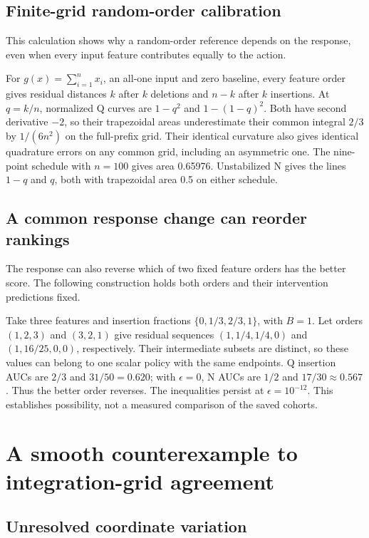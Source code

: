 \documentclass[12pt,letterpaper]{article}
\begin{document}
\subsection{Finite-grid random-order calibration}
\label{sec:random-calibration}

This calculation shows why a random-order reference depends on the response, even when every input feature contributes equally to the action.

For $g(x)=\sum_{i=1}^n x_i$, an all-one input and zero baseline, every feature order gives residual distances $k$ after $k$ deletions and $n-k$ after $k$ insertions. At $q=k/n$, normalized Q curves are $1-q^2$ and $1-(1-q)^2$. Both have second derivative $-2$, so their trapezoidal areas underestimate their common integral $2/3$ by $1/(6n^2)$ on the full-prefix grid. Their identical curvature also gives identical quadrature errors on any common grid, including an asymmetric one. The nine-point schedule with $n=100$ gives area 0.65976. Unstabilized N gives the lines $1-q$ and $q$, both with trapezoidal area 0.5 on either schedule.

\subsection{A common response change can reorder rankings}
\label{sec:ranking-comparison}

The response can also reverse which of two fixed feature orders has the better score. The following construction holds both orders and their intervention predictions fixed.

Take three features and insertion fractions $\{0,1/3,2/3,1\}$, with $B=1$. Let orders $(1,2,3)$ and $(3,2,1)$ give residual sequences $(1,1/4,1/4,0)$ and $(1,16/25,0,0)$, respectively. Their intermediate subsets are distinct, so these values can belong to one scalar policy with the same endpoints. Q insertion AUCs are $2/3$ and $31/50=0.620$; with $\epsilon=0$, N AUCs are $1/2$ and $17/30\approx0.567$. Thus the better order reverses. The inequalities persist at $\epsilon=10^{-12}$. This establishes possibility, not a measured comparison of the saved cohorts.

\section{A smooth counterexample to integration-grid agreement}
\label{sec:aliasing}

\subsection{Unresolved coordinate variation}
\label{sec:aliasing-proof}
\end{document}
